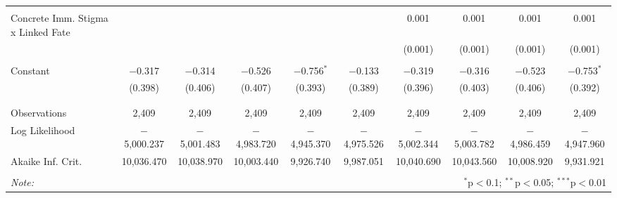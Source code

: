 \begin{table}[!htbp]
\begin{tabular}{@{\extracolsep{5pt}}lccccccccc}
  & & & & & & & & & \\ 
 Concrete Imm. Stigma x Linked Fate &  &  &  &  &  & 0.001 & 0.001 & 0.001 & 0.001 \\ 
  &  &  &  &  &  & (0.001) & (0.001) & (0.001) & (0.001) \\ 
  & & & & & & & & & \\ 
 Constant & $-$0.317 & $-$0.314 & $-$0.526 & $-$0.756$^{*}$ & $-$0.133 & $-$0.319 & $-$0.316 & $-$0.523 & $-$0.753$^{*}$ \\ 
  & (0.398) & (0.406) & (0.407) & (0.393) & (0.389) & (0.396) & (0.403) & (0.406) & (0.392) \\ 
  & & & & & & & & & \\ 
\hline \\[-1.8ex] 
Observations & 2,409 & 2,409 & 2,409 & 2,409 & 2,409 & 2,409 & 2,409 & 2,409 & 2,409 \\ 
Log Likelihood & $-$5,000.237 & $-$5,001.483 & $-$4,983.720 & $-$4,945.370 & $-$4,975.526 & $-$5,002.344 & $-$5,003.782 & $-$4,986.459 & $-$4,947.960 \\ 
Akaike Inf. Crit. & 10,036.470 & 10,038.970 & 10,003.440 & 9,926.740 & 9,987.051 & 10,040.690 & 10,043.560 & 10,008.920 & 9,931.921 \\ 
\hline 
\hline \\[-1.8ex] 
\textit{Note:}  & \multicolumn{9}{r}{$^{*}$p$<$0.1; $^{**}$p$<$0.05; $^{***}$p$<$0.01} \\ 
\end{tabular} 
\end{table} 
